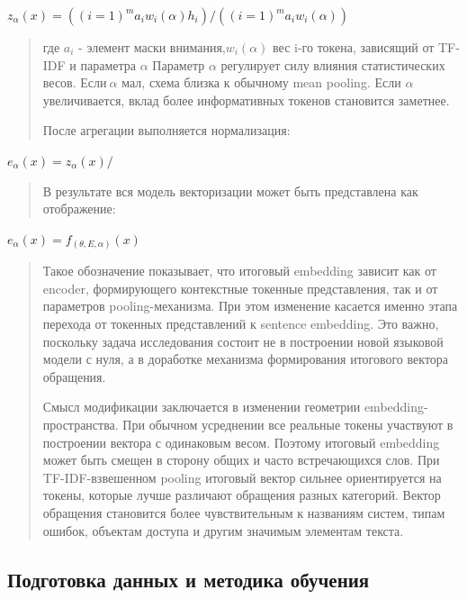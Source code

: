 \documentclass[
]{article}
\begin{document}
\(z_{\alpha}(x) = \left( (i = 1)^{m}a_{i}w_{i}(\alpha)h_{i} \right)/\left( (i = 1)^{m}a_{i}w_{i}(\alpha) \right)\)

\begin{quote}
где \(a_{i}\) - элемент маски внимания,\(w_{i}(\alpha)\) вес i-го
токена, зависящий от TF-IDF и параметра \(\alpha\) Параметр \(\alpha\)
регулирует силу влияния статистических весов. Если\(\ \alpha\) мал,
схема близка к обычному mean pooling. Если \(\alpha\) увеличивается,
вклад более информативных токенов становится заметнее.

После агрегации выполняется нормализация:
\end{quote}

\(e_{\alpha}(x) = z_{\alpha}(x)/\)

\begin{quote}
В результате вся модель векторизации может быть представлена как
отображение:
\end{quote}

\(e_{\alpha}(x) = f_{(\theta,E,\alpha)}(x)\)

\begin{quote}
Такое обозначение показывает, что итоговый embedding зависит как от
encoder, формирующего контекстные токенные представления, так и от
параметров pooling-механизма. При этом изменение касается именно этапа
перехода от токенных представлений к sentence embedding. Это важно,
поскольку задача исследования состоит не в построении новой языковой
модели с нуля, а в доработке механизма формирования итогового вектора
обращения.

Смысл модификации заключается в изменении геометрии
embedding-пространства. При обычном усреднении все реальные токены
участвуют в построении вектора с одинаковым весом. Поэтому итоговый
embedding может быть смещен в сторону общих и часто встречающихся слов.
При TF-IDF-взвешенном pooling итоговый вектор сильнее ориентируется на
токены, которые лучше различают обращения разных категорий. Вектор
обращения становится более чувствительным к названиям систем, типам
ошибок, объектам доступа и другим значимым элементам текста.
\end{quote}

\hypertarget{ux43fux43eux434ux433ux43eux442ux43eux432ux43aux430-ux434ux430ux43dux43dux44bux445-ux438-ux43cux435ux442ux43eux434ux438ux43aux430-ux43eux431ux443ux447ux435ux43dux438ux44f}{%
\subsection{Подготовка данных и методика
обучения}\label{ux43fux43eux434ux433ux43eux442ux43eux432ux43aux430-ux434ux430ux43dux43dux44bux445-ux438-ux43cux435ux442ux43eux434ux438ux43aux430-ux43eux431ux443ux447ux435ux43dux438ux44f}}
\end{document}
